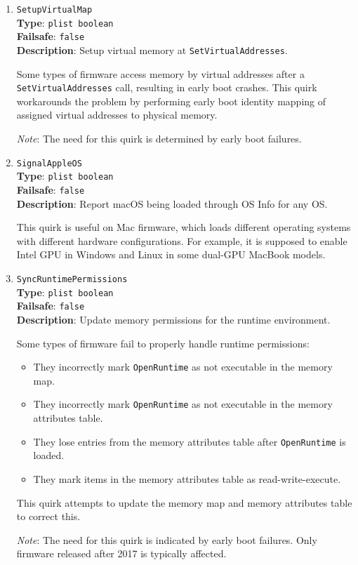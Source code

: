 \documentclass[]{article}
\providecommand{\tightlist}{%
  \setlength{\itemsep}{0pt}\setlength{\parskip}{0pt}}
\begin{document}
\begin{enumerate}
\item
  \texttt{SetupVirtualMap}\\
  \textbf{Type}: \texttt{plist\ boolean}\\
  \textbf{Failsafe}: \texttt{false}\\
  \textbf{Description}: Setup virtual memory at \texttt{SetVirtualAddresses}.

  Some types of firmware access memory by virtual addresses after a \texttt{SetVirtualAddresses}
  call, resulting in early boot crashes. This quirk workarounds the problem by
  performing early boot identity mapping of assigned virtual addresses to physical
  memory.

  \emph{Note}: The need for this quirk is determined by early boot failures.

\item
  \texttt{SignalAppleOS}\\
  \textbf{Type}: \texttt{plist\ boolean}\\
  \textbf{Failsafe}: \texttt{false}\\
  \textbf{Description}: Report macOS being loaded through OS Info for any OS.

  This quirk is useful on Mac firmware, which loads different operating systems
  with different hardware configurations. For example, it is supposed to enable
  Intel GPU in Windows and Linux in some dual-GPU MacBook models.

\item
  \texttt{SyncRuntimePermissions}\\
  \textbf{Type}: \texttt{plist\ boolean}\\
  \textbf{Failsafe}: \texttt{false}\\
  \textbf{Description}: Update memory permissions for the runtime environment.

  Some types of firmware fail to properly handle runtime permissions:
  \begin{itemize}
    \tightlist
    \item They incorrectly mark \texttt{OpenRuntime} as not executable in the memory map.
    \item They incorrectly mark \texttt{OpenRuntime} as not executable in the memory
    attributes table.
    \item They lose entries from the memory attributes table after \texttt{OpenRuntime}
    is loaded.
    \item They mark items in the memory attributes table as read-write-execute.
  \end{itemize}

  This quirk attempts to update the memory map and memory attributes table to correct this.

  \emph{Note}: The need for this quirk is indicated by early boot failures.
  Only firmware released after 2017 is typically affected.

\end{enumerate}
\end{document}
